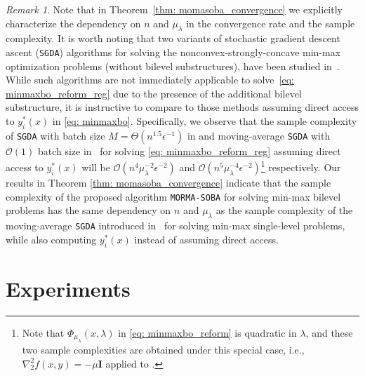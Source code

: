 \documentclass[10pt]{article}
\theoremstyle{remark}
\newtheorem*{remark}{Remark}
\newcommand{\cO}{\mathcal{O}}
\begin{document}
\begin{remark}
    Note that in Theorem~\ref{thm: momasoba_convergence} we explicitly characterize the dependency on $n$ and $\mu_{\lambda}$ in the convergence rate and the sample complexity. It is worth noting that two variants of stochastic gradient descent ascent (\texttt{SGDA}) algorithms for solving the nonconvex-strongly-concave min-max optimization problems (without bilevel substructures), 
    have been studied in~\cite{lin2020gradient, qiu2020single}. While such algorithms are not immediately applicable to solve~\eqref{eq: minmaxbo_reform_reg} due to the presence of the additional bilevel substructure, it is instructive to compare to those methods assuming direct access to $y_i^*(x)$ in \eqref{eq: minmaxbo}. Specifically, we  observe that the sample complexity of \texttt{SGDA} with batch size $M=\Theta(n^{1.5}\epsilon^{-1})$ in \cite{lin2020gradient} and moving-average \texttt{SGDA} with $\cO(1)$ batch size in~\cite{qiu2020single} for solving \eqref{eq: minmaxbo_reform_reg} assuming direct access to $y_i^*(x)$ will be $\cO\left(n^4\mu_{\lambda}^{-2}\epsilon^{-2}\right)$ and $\cO\left(n^5\mu_{\lambda}^{-4}\epsilon^{-2}\right)$\footnote{Note that $\Phi_{\mu_{\lambda}}(x, \lambda)$ in \eqref{eq: minmaxbo_reform} is quadratic in $\lambda$, and these two sample complexities are obtained under this special case, i.e., $\nabla_2^2f(x,y) = -\mu \mathbf{I}$ applied to \cite{lin2020gradient, qiu2020single}.} respectively. Our results in Theorem \ref{thm: momasoba_convergence} indicate that the sample complexity of the proposed algorithm \texttt{MORMA-SOBA} for solving min-max bilevel problems has the same dependency on $n$ and $\mu_\lambda$ as the sample complexity of the moving-average \texttt{SGDA} introduced in~\cite{qiu2020single} for solving min-max single-level problems, while also computing $y_i^*(x)$ instead of assuming direct access. 
\end{remark}

\section{Experiments}
\end{document}
